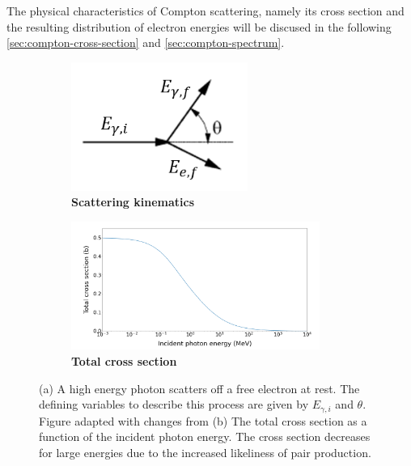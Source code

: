 The physical characteristics of Compton scattering, namely its cross section and
the resulting distribution of electron energies will be discused in the following
\autoref{sec:compton-cross-section} and \autoref{sec:compton-spectrum}.

\begin{figure}
\centering
\begin{subfigure}[h]{0.5\linewidth}
\centering
\includegraphics[height=4.2cm]{fig/compton-scattering.png}
\caption{\textbf{Scattering kinematics}\label{fig:compton-scattering}}
\end{subfigure}%
\begin{subfigure}[h]{0.5\linewidth}
\centering
\includegraphics[height=4.2cm]{fig/compton-cross-section.png}
\caption{\textbf{Total cross section}\label{fig:compton-cross-section}}
\end{subfigure}%
\caption*{(a) A high energy photon scatters off a free electron at
rest. The defining variables to describe this process are given by $E_{\gamma,i}$
and $\theta$. Figure adapted with changes from \cite{Sch17}
(b) The total cross section as a function of the incident photon energy.
The cross section decreases for large energies due to the increased likeliness of
pair production.}
\end{figure}

\newpage
